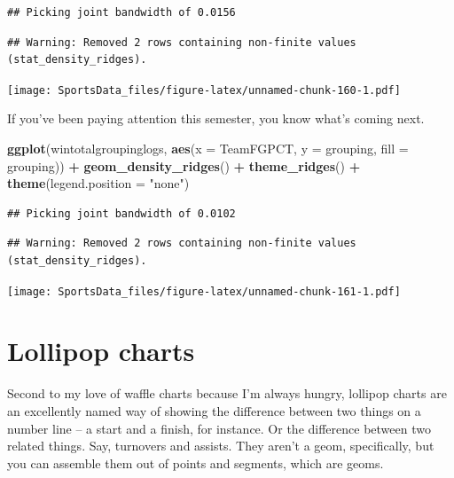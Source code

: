 \documentclass[]{book}
\newenvironment{Shaded}{\begin{snugshade}}{\end{snugshade}}
\newcommand{\KeywordTok}[1]{\textcolor[rgb]{0.13,0.29,0.53}{\textbf{#1}}}
\newcommand{\DataTypeTok}[1]{\textcolor[rgb]{0.13,0.29,0.53}{#1}}
\newcommand{\StringTok}[1]{\textcolor[rgb]{0.31,0.60,0.02}{#1}}
\newcommand{\OperatorTok}[1]{\textcolor[rgb]{0.81,0.36,0.00}{\textbf{#1}}}
\newcommand{\NormalTok}[1]{#1}
\begin{document}
\begin{verbatim}
## Picking joint bandwidth of 0.0156
\end{verbatim}

\begin{verbatim}
## Warning: Removed 2 rows containing non-finite values (stat_density_ridges).
\end{verbatim}

\texttt{[image: SportsData\_files/figure-latex/unnamed-chunk-160-1.pdf]}

If you've been paying attention this semester, you know what's coming
next.

\begin{Shaded}
\begin{Highlighting}[]
\KeywordTok{ggplot}\NormalTok{(wintotalgroupinglogs, }\KeywordTok{aes}\NormalTok{(}\DataTypeTok{x =}\NormalTok{ TeamFGPCT, }\DataTypeTok{y =}\NormalTok{ grouping, }\DataTypeTok{fill =}\NormalTok{ grouping)) }\OperatorTok{+}
\StringTok{  }\KeywordTok{geom_density_ridges}\NormalTok{() }\OperatorTok{+}
\StringTok{  }\KeywordTok{theme_ridges}\NormalTok{() }\OperatorTok{+}\StringTok{ }
\StringTok{  }\KeywordTok{theme}\NormalTok{(}\DataTypeTok{legend.position =} \StringTok{"none"}\NormalTok{)}
\end{Highlighting}
\end{Shaded}

\begin{verbatim}
## Picking joint bandwidth of 0.0102
\end{verbatim}

\begin{verbatim}
## Warning: Removed 2 rows containing non-finite values (stat_density_ridges).
\end{verbatim}

\texttt{[image: SportsData\_files/figure-latex/unnamed-chunk-161-1.pdf]}

\chapter{Lollipop charts}\label{lollipop-charts}

Second to my love of waffle charts because I'm always hungry, lollipop
charts are an excellently named way of showing the difference between
two things on a number line -- a start and a finish, for instance. Or
the difference between two related things. Say, turnovers and assists.
They aren't a geom, specifically, but you can assemble them out of
points and segments, which are geoms.
\end{document}
